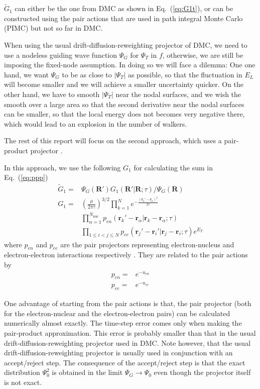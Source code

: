 \documentclass[aps,prl,reprint,groupedaddress]{revtex4-1}
\begin{document}
$\widetilde{G}_1$ can either be the one from DMC as shown in Eq.~(\ref{eq:G1t}), or can be constructed using the pair actions that are used in path integral Monte Carlo (PIMC) but not so far in DMC.

When using the usual drift-diffusion-reweighting projector of DMC, we need to use a nodeless guiding wave function $\Psi_G$ for $\Psi_T$ in $f$, otherwise, we are still be imposing the fixed-node assumption.
In doing so we will face a dilemma:
One one hand, we want $\Psi_G$ to be as close to $|\Psi_T|$ as possible, so that the fluctuation in $E_L$ will become smaller and we will achieve a smaller uncertainty quicker.
On the other hand, we have to smooth $|\Psi_T|$ near the nodal surfaces, and we wish the smooth over a large area so that the second derivative near the nodal surfaces can be smaller, so that the local energy does not becomes very negative there, which would lead to an explosion in the number of walkers.

The rest of this report will focus on the second approach, which uses a pair-product projector \cite{umrigar2015observations}.

In this approach, we use the following $G_1$ for calculating the sum in Eq.~(\ref{eq:ppp})
\begin{align}
\label{eq:G1ppp}
\widetilde{G}_1 = & \Psi_G(\bm{R'})G_1(\bm{R'}|\bm{R};\tau)/\Psi_G(\bm{R})\\
G_1 = & \left(\frac{\mu}{2\pi\tau}\right)^{3/2}
\prod\limits_{k=1}^{N}e^{-\frac{(\bm{r}_k'-\bm{r}_k)^2}{2\tau}}\nonumber\\
 & \prod\limits_{\alpha = 1}^{N_{\mathrm{nuc}}}
p_{en}(\bm{r}_k'-\bm{r}_\alpha|\bm{r}_k-\bm{r}_\alpha;\tau)\nonumber\\
 & \prod\limits_{1\leq i < j \leq N}p_{ee}(\bm{r}_j'-\bm{r}_i'|\bm{r}_j-\bm{r}_i;\tau)
e^{E_T}
\end{align}
where $p_{en}$ and $p_{ee}$ are the pair projectors representing electron-nucleus and electron-electron interactions respectively \cite{umrigar2015observations}.
They are related to the pair actions by
\begin{align}
p_{en} = & e^{-u_{en}}\\
p_{ee} = & e^{-u_{ee}}
\end{align}

One advantage of starting from the pair actions is that, the pair projector (both for the electron-nuclear and the electron-electron pairs) can be calculated numerically almost exactly.  The time-step error comes only when making the pair-product approximation.  This error is probably smaller than that in the usual drift-diffusion-reweighting projector used in DMC.
Note however, that the usual drift-diffusion-reweighting projector is usually used in conjunction with an accept/reject
step.  The consequence of the accept/reject step is that the exact distribution $\Psi_0^2$ is obtained in
the limit $\Psi_G \to \Psi_0$ even though the projector itself is not exact.
\end{document}
